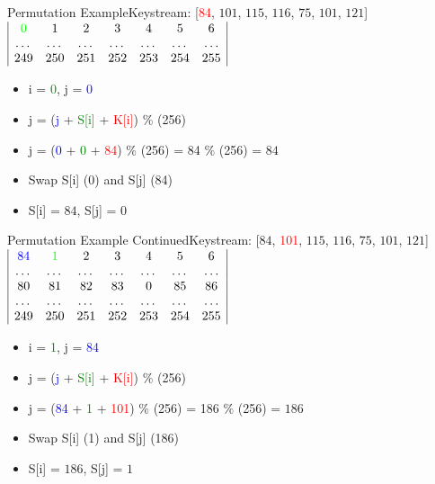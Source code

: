 \documentclass[
	aspectratio=169,	%
	onlytextwidth,		%
	t					%
	]{beamer}
\begin{document}
\begin{frame}{Permutation Example}{Keystream: [\textcolor{red} {84}, $101$, $115$, $116$, $75$, $101$, $121$]}
	\medskip
	$\begin{array}{|ccccccc|}
		\textcolor{green}{0} & 1 & 2 & 3 & 4 & 5 & 6 \\
		\dots & \dots & \dots & \dots & \dots & \dots & \dots \\
		249 & 250 & 251 & 252 & 253 & 254 & 255 \\
	\end{array}$
	\medskip
	\begin{itemize}[<+->]
		\item i = \textcolor{green}{0}, j = \textcolor{blue}{0}
		\item j = (\textcolor{blue} {j} + \textcolor{green}{S[i]} + \textcolor{red}{K[i]}) $\%$ (256)
		\item j = (\textcolor{blue} {0} + \textcolor{green} {0} + \textcolor{red} {84}) $\%$ (256) = 84 $\%$ (256) = $84$
		\item Swap S[i] (0) and S[j] (84)
		\item S[i] = $84$, S[j] = $0$
	\end{itemize}
\end{frame}

\begin{frame}{Permutation Example Continued}{Keystream: [$84$, \textcolor{red} {101}, $115$, $116$, $75$, $101$, $121$]}
	$\begin{array}{|ccccccc|}
		\textcolor{blue}{84} & \textcolor{green}{1} & 2 & 3 & 4 & 5 & 6 \\
		\dots & \dots & \dots & \dots & \dots & \dots & \dots \\
		80 & 81 & 82 & 83 & 0 & 85 & 86 \\
		\dots & \dots & \dots & \dots & \dots & \dots & \dots \\
		249 & 250 & 251 & 252 & 253 & 254 & 255 \\
	\end{array}$
	\begin{itemize}[<+->]
		\item i = \textcolor{green}{1}, j = \textcolor{blue} {84}
		\item j = (\textcolor{blue} {j} + \textcolor{green}{S[i]} + \textcolor{red}{K[i]}) $\%$ (256)
		\item j = (\textcolor{blue} {84} + \textcolor{green} {1} + \textcolor{red} {101}) $\%$ (256) = 186 $\%$ (256) = $186$
		\item Swap S[i] (1) and S[j] (186)
		\item S[i] = $186$, S[j] = $1$
	\end{itemize}
\end{frame}
\end{document}
